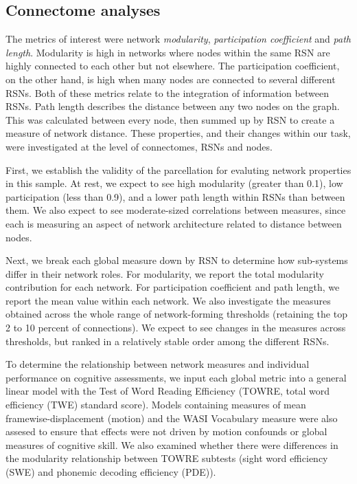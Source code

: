 \subsection{Connectome analyses}

The metrics of interest were network \textit{modularity}, \textit{participation coefficient} and \textit{path length}. Modularity is high in networks where nodes within the same RSN are highly connected to each other but not elsewhere. The participation coefficient, on the other hand, is high when many nodes are connected to several different RSNs. Both of these metrics relate to the integration of information between RSNs. Path length describes the distance between any two nodes on the graph. This was calculated between every node, then summed up by RSN to create a measure of network distance. These properties, and their changes within our task, were investigated at the level of connectomes, RSNs and nodes. 

First, we establish the validity of the parcellation for evaluting network properties in this sample. At rest, we expect to see high modularity (greater than 0.1), low participation (less than 0.9), and a lower path length within RSNs than between them. We also expect to see moderate-sized correlations between measures, since each is measuring an aspect of network architecture related to distance between nodes.  

Next, we break each global measure down by RSN to determine how sub-systems differ in their network roles. For modularity, we report the total modularity contribution for each network. For participation coefficient and path length, we report the mean value within each network. We also investigate the measures obtained across the whole range of network-forming thresholds (retaining the top 2 to 10 percent of connections). We expect to see changes in the measures across thresholds, but ranked in a relatively stable order among the different RSNs. 

To determine the relationship between network measures and individual performance on cognitive assessments, we input each global metric into a general linear model with the Test of Word Reading Efficiency (TOWRE, total word efficiency (TWE) standard score). Models containing measures of mean framewise-displacement (motion) and the WASI Vocabulary measure were also assesed to ensure that effects were not driven by motion confounds or global measures of cognitive skill. We also examined whether there were differences in the modularity relationship between TOWRE subtests (sight word efficiency (SWE) and phonemic decoding efficiency (PDE)). 

